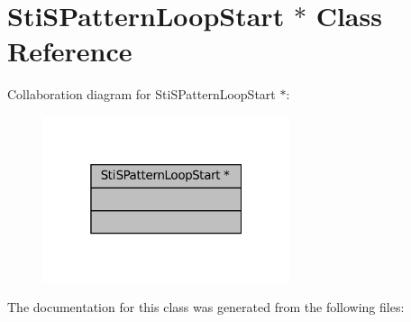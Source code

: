 \hypertarget{classStiSPatternLoopStart_01_5}{}\section{Sti\+S\+Pattern\+Loop\+Start $\ast$ Class Reference}
\label{classStiSPatternLoopStart_01_5}


Collaboration diagram for Sti\+S\+Pattern\+Loop\+Start $\ast$\+:
\nopagebreak
\begin{figure}[H]
\begin{center}
\leavevmode
\includegraphics[width=205pt]{classStiSPatternLoopStart_01_5__coll__graph}
\end{center}
\end{figure}


The documentation for this class was generated from the following files\+: